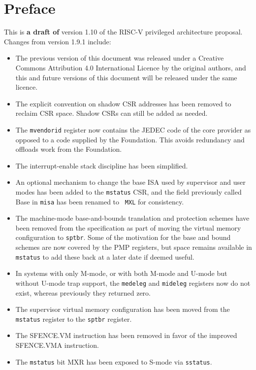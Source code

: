\chapter{Preface}

This is {\bf a draft of} version 1.10 of the RISC-V privileged
architecture proposal.  Changes from version 1.9.1 include:

\begin{itemize}
  \parskip 0pt
  \itemsep 1pt
\item The previous version of this document was released under a
  Creative Commons Attribution 4.0 International Licence by the
  original authors, and this and future versions of this document will
  be released under the same licence.
\item The explicit convention on shadow CSR addresses has been removed
  to reclaim CSR space.  Shadow CSRs can still be added as needed.
\item The {\tt mvendorid} register now contains the JEDEC code of the
  core provider as opposed to a code supplied by the Foundation.  This
  avoids redundancy and offloads work from the Foundation.
\item The interrupt-enable stack discipline has been simplified.
\item An optional mechanism to change the base ISA used by supervisor
  and user modes has been added to the {\tt mstatus} CSR, and the
  field previously called Base in {\tt misa} has been renamed to {\tt
    MXL} for consistency.
\item The machine-mode base-and-bounds translation and protection
  schemes have been removed from the specification as part of moving
  the virtual memory configuration to {\tt sptbr}.  Some of the
  motivation for the base and bound schemes are now covered by the PMP
  registers, but space remains available in {\tt mstatus} to add these
  back at a later date if deemed useful.
\item In systems with only M-mode, or with both M-mode and U-mode but
  without U-mode trap support, the {\tt medeleg} and {\tt mideleg}
    registers now do not exist, whereas previously they returned zero.
\item The supervisor virtual memory configuration has been moved from the
  {\tt mstatus} register to the {\tt sptbr} register.
\item The SFENCE.VM instruction has been removed in favor of the improved
  SFENCE.VMA instruction.
\item The {\tt mstatus} bit MXR has been exposed to S-mode via {\tt sstatus}.

\end{itemize}

